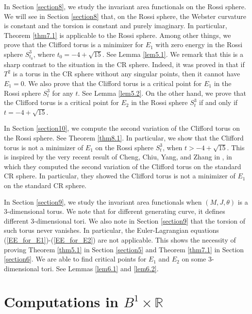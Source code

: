 \documentclass{amsart}
\theoremstyle{Corollary}
\numberwithin{equation}{section}
\begin{document}
In Section \ref{section8}, 
we study the invariant area functionals 
on the Rossi sphere. 
We will see in Section \ref{section8} 
that, on the Rossi sphere, the Webster curvature is constant and the torsion is constant and purely imaginary. 
In particular, Theorem \ref{thm7.1} is applicable to the Rossi sphere. 
Among other things, we prove that 
the Clifford torus is a minimizer for   $E_1$
with zero energy in the Rossi sphere $S^3_{t_0}$, where 
$t_0=-4+\sqrt{15}$. See Lemma \ref{lem5.1}.
We remark that this is a sharp contrast 
to the situation in the CR sphere. 
Indeed, it was proved in \cite{CYZ}
that if $T^2$ is a torus in the CR sphere 
without any singular points, then it cannot have $E_1=0$. 
We also prove that the 
Clifford torus 
is a critical point for $E_1$
in the Rossi sphere $S^3_{t}$ for any $t$. 
See Lemma \ref{lem5.2}.
On the other hand, we prove that 
the Clifford torus 
is a critical point for $E_2$
in the Rossi sphere $S^3_{t}$ 
if and only if $t=-4+\sqrt{15}$.

In Section \ref{section10}, 
we compute the second variation of the Clifford torus 
on the Rossi sphere. See Theorem \ref{thm8.1}.
In particular, we show that the Clifford torus is not a
minimizer 
of $E_1$ on the Rossi sphere $S^3_t$, when   $t>-4+\sqrt{15}$. 
This is inspired by the very recent result 
of Cheng, Chiu, Yang, and Zhang in \cite{CCYZ}, 
in which they computed the second variation of the Clifford torus 
on the standard CR sphere. 
In particular, they showed the Clifford torus is not a minimizer 
of $E_1$ on the standard CR sphere. 




In Section \ref{section9}, we study the invariant area functionals
when $(M,J,\theta)$ is a $3$-dimensional torus. 
We note that 
for different generating curve, it defines different $3$-dimensional tori. 
We also note in Section \ref{section9} that  the torsion of such torus never vanishes. 
In particular, the Euler-Lagrangian equations 
(\ref{EE_for_E1})-(\ref{EE_for_E2}) are not applicable. 
This shows the necessity of proving 
Theorem \ref{thm5.1} in Section \ref{section5} and Theorem \ref{thm7.1}
in Section \ref{section6}. 
We are able to find critical points 
for $E_1$ and $E_2$ on some $3$-dimensional tori. 
See Lemmas \ref{lem6.1} and \ref{lem6.2}.




\section{Computations in $B^1\times\mathbb{R}$}\label{section2}
\end{document}
